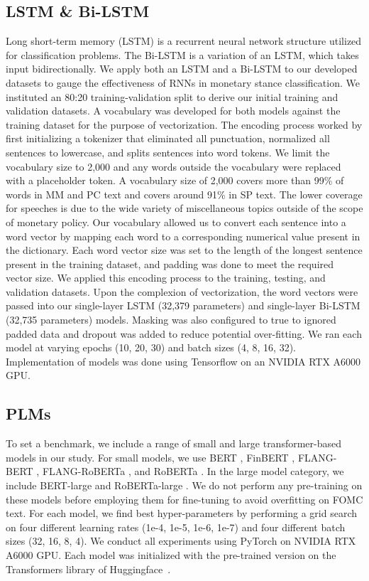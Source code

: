 \documentclass[11pt]{article}
\begin{document}
\subsection{LSTM \& Bi-LSTM}
Long short-term memory (LSTM) is a recurrent neural network structure utilized for classification problems. The Bi-LSTM is a variation of an LSTM, which takes input bidirectionally. We apply both an LSTM and a Bi-LSTM to our developed datasets to gauge the effectiveness of RNNs in monetary stance classification. 
We instituted an 80:20 training-validation split to derive our initial training and validation datasets.
A vocabulary was developed for both models against the training dataset for the purpose of vectorization. The encoding process worked by first initializing a tokenizer that eliminated all punctuation, normalized all sentences to lowercase, and splits sentences into word tokens. We limit the vocabulary size to 2,000 and any words outside the vocabulary were replaced with a placeholder token. A vocabulary size of 2,000 covers more than 99\% of words in MM and PC text and covers around 91\% in SP text. The lower coverage for speeches is due to the wide variety of miscellaneous topics outside of the scope of monetary policy. 
Our vocabulary allowed us to convert each sentence into a word vector by mapping each word to a corresponding numerical value present in the dictionary. Each word vector size was set to the length of the longest sentence present in the training dataset, and padding was done to meet the required vector size. We applied this encoding process to the training, testing, and validation datasets. 
Upon the complexion of vectorization, the word vectors were passed into our single-layer LSTM (32,379 parameters) and single-layer Bi-LSTM (32,735 parameters) models. Masking was also configured to true to ignored padded data and dropout was added to reduce potential over-fitting. We ran each model at varying epochs (10, 20, 30) and batch sizes (4, 8, 16, 32). Implementation of models was done using Tensorflow \citep{tensorflow} on an NVIDIA RTX A6000 GPU. 

\subsection{PLMs}
To set a benchmark, we include a range of small and large transformer-based models in our study. For small models, we use BERT \citep{bert}, FinBERT \citep{finbert}, FLANG-BERT \citep{shah-etal-2022-flang}, FLANG-RoBERTa \citep{shah-etal-2022-flang}, and RoBERTa \citep{roberta}. In the large model category, we include BERT-large \citep{bert} and RoBERTa-large \citep{roberta}. We do not perform any pre-training on these models before employing them for fine-tuning to avoid overfitting on FOMC text. For each model, we find best hyper-parameters by performing a grid search on four different learning rates (1e-4, 1e-5, 1e-6, 1e-7) and four different batch sizes (32, 16, 8, 4). We conduct all experiments using PyTorch \citep{pytorch} on NVIDIA RTX A6000 GPU. Each model was initialized with the pre-trained version on the Transformers library of Huggingface~\citep{huggingface}. 
\end{document}
